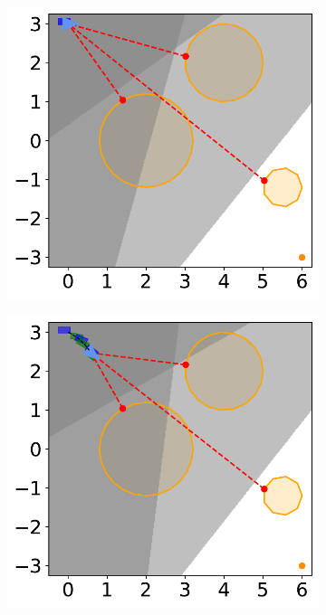\newpage
\begin{figure}[H]
    \centering
    \begin{subfigure}{0.35\textwidth}
        \centering
        \includegraphics[width=\textwidth]{figures/Simulations/sim1circles_delta/frame_0.pdf}
    \end{subfigure}%
    \hfil
    \begin{subfigure}{0.35\textwidth}
        \centering
        \includegraphics[width=\textwidth]{figures/Simulations/sim1circles_delta/frame_1.pdf}
    \end{subfigure}%


\end{figure}
